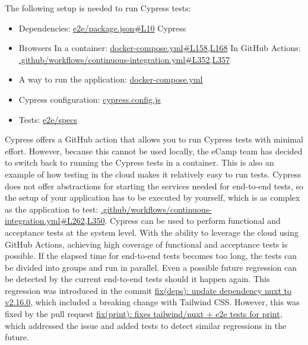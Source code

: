 \documentclass[conference]{IEEEtran}
\begin{document}
The following setup is needed to run Cypress tests:
\begin{itemize}
	\item Dependencies: \href{https://github.com/ecamp/ecamp3/blob/7a1cf92e3eee27b0b942fcd87bd8ce5c221089b7/e2e/package.json#L10}{e2e/package.json\#L10}
	      \subitem Cypress
	\item Browsers
	      \subitem In a container: \href{https://github.com/ecamp/ecamp3/blob/7a1cf92e3eee27b0b942fcd87bd8ce5c221089b7/docker-compose.yml#L158,L168}{docker-compose.yml\#L158,L168}
	      \subitem In GitHub Actions: \href{https://github.com/ecamp/ecamp3/blob/7a1cf92e3eee27b0b942fcd87bd8ce5c221089b7/.github/workflows/continuous-integration.yml#L352,L357}{.github/workflows/continuous-integration.yml\#L352,L357}
	\item A way to run the application: \href{https://github.com/ecamp/ecamp3/blob/7a1cf92e3eee27b0b942fcd87bd8ce5c221089b7/docker-compose.yml}{docker-compose.yml}
	\item Cypress configuration: \href{https://github.com/ecamp/ecamp3/blob/7a1cf92e3eee27b0b942fcd87bd8ce5c221089b7/e2e/cypress.config.js}{cypress.config.js}
	\item Tests: \href{https://github.com/ecamp/ecamp3/tree/7a1cf92e3eee27b0b942fcd87bd8ce5c221089b7/e2e/specs}{e2e/specs}
\end{itemize}
Cypress offers a GitHub action that allows you to run Cypress tests with minimal effort.
However, because this cannot be used locally, the eCamp team has decided to switch back to running the Cypress tests in
a container\cite{ecamp3-e2e-tests-in-container}.
This is also an example of how testing in the cloud makes it relatively easy to run tests.
Cypress does not offer abstractions for starting the services needed for end-to-end tests\cite{cypress-website-best-practice-web-servers},
so the setup of your application has to be executed by yourself, which is as complex as the application to test: \href{https://github.com/ecamp/ecamp3/blob/7a1cf92e3eee27b0b942fcd87bd8ce5c221089b7/.github/workflows/continuous-integration.yml#L262,L350}{.github/workflows/continuous-integration.yml\#L262,L350}.
\newline
Cypress can be used to perform functional and acceptance tests at the system level.
With the ability to leverage the cloud using GitHub Actions, achieving high coverage of functional and acceptance tests is possible.
If the elapsed time for end-to-end tests becomes too long, the tests can be divided into groups and run in parallel.
Even a possible future regression can be detected by the current end-to-end tests should it happen again.
This regression was introduced in the commit \href{https://github.com/ecamp/ecamp3/commit/55c728e5b543a920a97988882df2ea99136228ea}{fix(deps): update dependency nuxt to v2.16.0},
which included a breaking change with Tailwind CSS.
However, this was fixed by the pull request \href{https://github.com/ecamp/ecamp3/pull/3275}{fix(print): fixes tailwind/nuxt + e2e tests for print},
which addressed the issue and added tests to detect similar regressions in the future.
\end{document}
